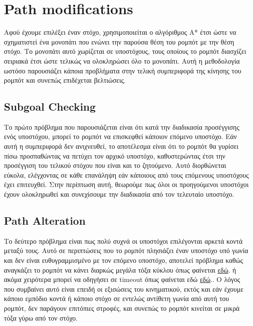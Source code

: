 \section*{Path modifications}
Αφού έχουμε επιλέξει έναν στόχο, χρησιμοποιείται ο αλγόριθμος A* έτσι ώστε να σχηματιστεί ένα μονοπάτι που ενώνει την παρούσα θέση του ρομπότ με την θέση στόχο. Το μονοπάτι αυτό χωρίζεται σε υποστόχους, τους οποίους το ρομπότ διασχίζει σειριακά έτσι ώστε τελικώς να ολοκληρώσει όλο το μονοπάτι. Αυτή η μεθοδολογία ωστόσο παρουσιάζει κάποια προβλήματα στην τελική συμπεριφορά της κίνησης του ρομπότ και συνεπώς επιδέχεται βελτιώσεις.

\subsection*{Subgoal Checking}

Το πρώτο πρόβλημα που παρουσιάζεται είναι ότι κατά την διαδικασία προσέγγισης ενός υποστόχου, μπορεί το ρομπότ να επισκεφθεί κάποιον επόμενο υποστόχο. Εάν αυτή η συμπεριφορά δεν ανιχνευθεί, το αποτέλεσμα είναι ότι το ρομπότ θα γυρίσει πίσω προσπαθώντας να πετύχει τον αρχικό υποστόχο, καθυστερώντας έτσι την προσέγγιση του τελικού στόχου που είναι και το ζητούμενο. Αυτό διορθώνεται εύκολα, ελέγχοντας σε κάθε επανάληψη εάν κάποιους από τους επόμενους υποστόχους έχει επιτευχθεί. Στην περίπτωση αυτή, θεωρούμε πως όλοι οι προηγούμενοι υποστόχοι έχουν ολοκληρωθεί και συνεχίσουμε την διαδικασία από τον τελευταίο υποστόχο.

\subsection*{Path Alteration}

Το δεύτερο πρόβλημα είναι πως πολύ συχνά οι υποστόχοι επιλέγονται αρκετά κοντά μεταξύ τους. Αυτό σε περιπτώσεις που το ρομπότ πλησιάζει έναν υποστόχο υπό γωνία και δεν είναι ευθυγραμμισμένο με τον επόμενο υποστόχο, αποτελεί πρόβλημα καθώς αναγκάζει το ρομπότ να κάνει διαρκώς μεγάλα τόξα κύκλου όπως φαίνεται \href{https://www.youtube.com/watch?v=FA4BnU7saH8&feature=youtu.be}{εδώ}. ή ακόμα χειρότερα μπορεί να οδηγήσει σε timeout όπως φαίνεται εδώ \href{https://www.youtube.com/watch?v=SibrOLLamUY&feature=youtu.be}{εδώ}.. Ο λόγος που συμβαίνει αυτό είναι επειδή οι εξισώσεις του κινηματικού, εκτός και εάν έχουμε κάποιο εμπόδιο κοντά ή κάποιο στόχο σε εντελώς αντίθετη γωνία από αυτή του ρομπότ, δεν παράγουν επιτόπιες στροφές, και συνεπώς το ρομπότ κινείται σε μικρά τόξα γύρω από τον στόχο.

